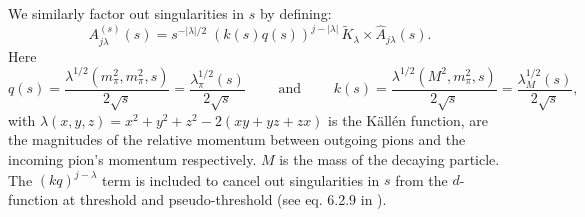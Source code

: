 We similarly factor out singularities in \(s\) by defining:
  \begin{equation}
    \label{eq:kinematicfreepartialwave}
    A^{(s)}_{j\lambda}(s) = s^{-|\lambda|/2} \;  (k(s)q(s))^{j - |\lambda|} \, \tilde{K}_{\lambda} \times \hat{A}_{j\lambda}(s).
  \end{equation}
Here
  \begin{equation}
    \label{eq:momenta}
    q(s) = \frac{\lambda^{1/2}(m_\pi^2, m_\pi^2, s)}{2\sqrt{s}} = \frac{\lambda_\pi^{1/2}(s)}{2\sqrt{s}}
     \qquad \text{ and } \qquad
     k(s) = \frac{\lambda^{1/2}(M^2, m_\pi^2, s)}{2\sqrt{s}} = \frac{\lambda_M^{1/2}(s)}{2\sqrt{s}} ,
  \end{equation}
with \(\lambda(x,y,z) = x^2 + y^2 + z^2 - 2 (xy + yz + zx)\) is the K\"{a}ll\'{e}n function, are the magnitudes of  the relative momentum between outgoing pions and the incoming pion's momentum respectively. \(M\) is the mass of the decaying particle. The \((kq)^{j-\lambda}\) term is included to cancel out singularities in \(s\) from the \(d\)-function at threshold and pseudo-threshold (see eq. 6.2.9 in \cite{Collins}).


